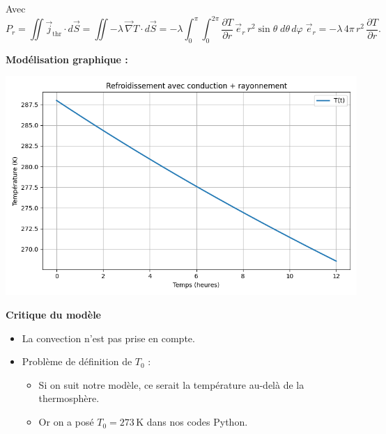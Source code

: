 \documentclass[a4paper,12pt]{article}
\begin{document}
\medskip

Avec
\[
P_{r}
= \iint\vec j_{\mathrm{thr}}\cdot d\vec S
= \iint -\lambda\,\vec{ \nabla } T\cdot d\vec S
= -\lambda
  \int_{0}^{\pi}\!\!\int_{0}^{2\pi}
    \frac{\partial T}{\partial r}\,\vec e_{r}\,
    r^2\sin\theta\;d\theta\,d\varphi\;\vec e_{r}
= -\lambda\,4\pi\,r^2\,\frac{\partial T}{\partial r}.
\]

\textbf{Modélisation graphique :} 
    
    \includegraphics[width=0.8\linewidth]{../modele3/figures/modele3_coquille-conduction-rayonnement.png}    


\textbf{Critique du modèle}
\vspace{1cm}
\begin{itemize}
    \item La convection n’est pas prise en compte.
    \item Problème de définition de $T_0$ :
    \begin{itemize}
        \item Si on suit notre modèle, ce serait la température au-delà de la thermosphère.
        \item Or on a posé $T_0 = 273\, \mathrm{K}$ dans nos codes Python.
    \end{itemize}
\end{itemize}
\end{document}
